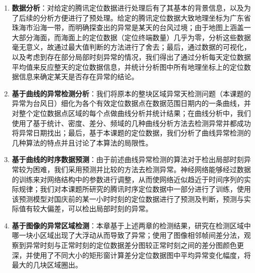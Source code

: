 \documentclass[a4paper,AutoFakeBold,oneside,12pt]{book}
\begin{document}
\begin{enumerate}
\item \textbf{数据分析}：对给定的腾讯定位数据进行处理后有了其基本的背景信息，以及为了后续的分析方便进行了预处理。给定的腾讯定位数据大致地理坐标为广东省珠海市沿海一带，而明确探查出的异常是某天的台风过境；由于地图上涵盖一大部分海面，而海面上的定位数据（定位终端数量）几乎为零，分析这些数据毫无意义，故通过最大值判断的方法进行了舍去；最后，通过数据的可视化，以及考虑到存在部分局部时刻异常的情况，我们得出了通过分析每天定位数据平均值来反应整天的定位数据信息，并统计分析图中所有地理坐标上的定位数据信息来确定某天是否存在异常的结论。
\item \textbf{基于曲线的异常检测分析}：我们将原本的整块区域异常天检测问题（本课题的异常为台风日）细化为各个有效定位数据点在数据范围日期内的一条曲线，并对整个定位数据点区域的每个点做曲线分析并统计结果；在曲线分析中，我们使用了基于统计、密度、差分、频域的几种曲线分析方法去检测异常并都成功将异常日期找出；最后，基于本课题的定位数据，我们分析了曲线异常检测的几种算法的特点并且讨论了本算法的局限性。
\item \textbf{基于曲线的时序数据预测}：由于前述曲线异常检测的算法对于检出局部时刻异常较为困难，我们采用预测并比较的方法去检测异常。神经网络能够经过数据的训练来对网络结构中的参数进行调整，从而使网络近似趋近于时间序列的实际规律；我们对本课题所研究的腾讯时序定位数据中一部分进行了训练，使用该预测模型对国庆前的某一小时时刻的定位数据进行了预测及判断，预测与实际值有较大偏差，可以检出局部时刻的异常。
\item \textbf{基于图像的异常区域检测}：本章基于上述两章的检测结果，研究在检测区域中哪一块小区域出现了大浮动从而导致了异常；使用了图像相邻帧间差分法，观察到异常时刻与正常时刻的定位数据差分图较正常时刻之间的差分图颜色更深，并使用了不同大小的矩形窗计算差分定位数据图中平均异常变化幅度，将最大的几块区域圈出。
\end{enumerate}
\end{document}
